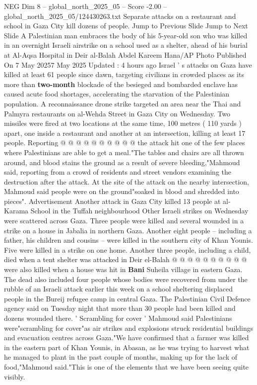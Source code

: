 \begin{textsample}{NEG Dim 8 – global\_north\_2025\_05 – Score -2.00 – global\_north\_2025\_05/124430263.txt}  \label{ex:f8_neg_056}
Separate attacks on a restaurant and school in Gaza City kill dozens of people.
Jump to Previous Slide Jump to Next Slide A Palestinian man embraces the body of his 5-year-old son who was killed in an overnight Israeli airstrike on a school used as a shelter, ahead of his burial at Al-Aqsa Hospital in Deir al-Balah Abdel Kareem Hana/AP Photo Published On 7 May 20257 May 2025 Updated : 4 hours ago Israel ' s attacks on Gaza have killed at least 61 people since dawn, targeting civilians in crowded places as its more than \textbf{two-month} blockade of the besieged and bombarded enclave has caused acute food shortages, accelerating the starvation of the Palestinian population.
A reconnaissance drone strike targeted an area near the Thai and Palmyra restaurants on al-Wehda Street in Gaza City on Wednesday.
Two missiles were fired at two locations at the same time, 100 metres ( 110 yards ) apart, one inside a restaurant and another at an intersection, killing at least 17 people.
Reporting @ @ @ @ @ @ @ @ @ @ the attack hit one of the few places where Palestinians are able to get a meal."The tables and chairs are all thrown around, and blood stains the ground as a result of severe bleeding,"Mahmoud said, reporting from a crowd of residents and street vendors examining the destruction after the attack.
At the site of the attack on the nearby intersection, Mahmoud said people were on the ground"soaked in blood and shredded into pieces".
Advertisement Another attack in Gaza City killed 13 people at al-Karama School in the Tuffah neighbourhood Other Israeli strikes on Wednesday were scattered across Gaza.
Three people were killed and several wounded in a strike on a house in Jabalia in northern Gaza.
Another eight people -- including a father, his children and cousins -- were killed in the southern city of Khan Younis.
Five were killed in a strike on one home.
Another three people, including a child, died when a tent shelter was attacked in Deir el-Balah @ @ @ @ @ @ @ @ @ @ were also killed when a house was hit in \textbf{Bani} Suheila village in eastern Gaza.
The dead also included four people whose bodies were recovered from under the rubble of an Israeli attack earlier this week on a school sheltering displaced people in the Bureij refugee camp in central Gaza.
The Palestinian Civil Defence agency said on Tuesday night that more than 30 people had been killed and dozens wounded there. ' Scrambling for cover ' Mahmoud said Palestinians were"scrambling for cover"as air strikes and explosions struck residential buildings and evacuation centres across Gaza."We have confirmed that a farmer was killed in the eastern part of Khan Younis, in Abasan, as he was trying to harvest what he managed to plant in the past couple of months, making up for the lack of food,"Mahmoud said."This is one of the elements that we have been seeing quite visibly.

\end{textsample}
